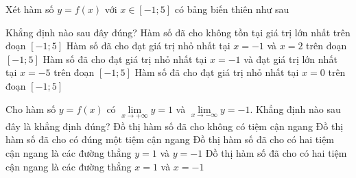 \begin{ex}%
	Xét hàm số $y=f(x)$ với $x\in [-1;5]$ có bảng biến thiên như sau
	\begin{center}
	\end{center}
	Khẳng định nào sau đây đúng?
	\choice
	{\True Hàm số đã cho không tồn tại giá trị lớn nhất trên đoạn $[-1;5]$}
	{Hàm số đã cho đạt giá trị nhỏ nhất tại $x=-1$ và $x=2$ trên đoạn $[-1;5]$}
	{Hàm số đã cho đạt giá trị nhỏ nhất tại $x=-1$ và đạt giá trị lớn nhất tại $x=-5$ trên đoạn $[-1;5]$}
	{Hàm số đã cho đạt giá trị nhỏ nhất tại $x=0$ trên đoạn $[-1;5]$}
\end{ex}

\begin{ex}%
	Cho hàm số $y=f(x)$ có $\lim\limits_{x\rightarrow +\infty}y=1$ và $\lim\limits_{x\rightarrow -\infty}y=-1$. Khẳng định nào sau đây là khẳng định đúng?
	\choice
	{Đồ thị hàm số đã cho không có tiệm cận ngang}
	{Đồ thị hàm số đã cho có đúng một tiệm cận ngang}
	{\True Đồ thị hàm số đã cho có hai tiệm cận ngang là các đường thẳng $y=1$ và $y=-1$}
	{Đồ thị hàm số đã cho có hai tiệm cận ngang là các đường thẳng $x=1$ và $x=-1$}
\end{ex}

